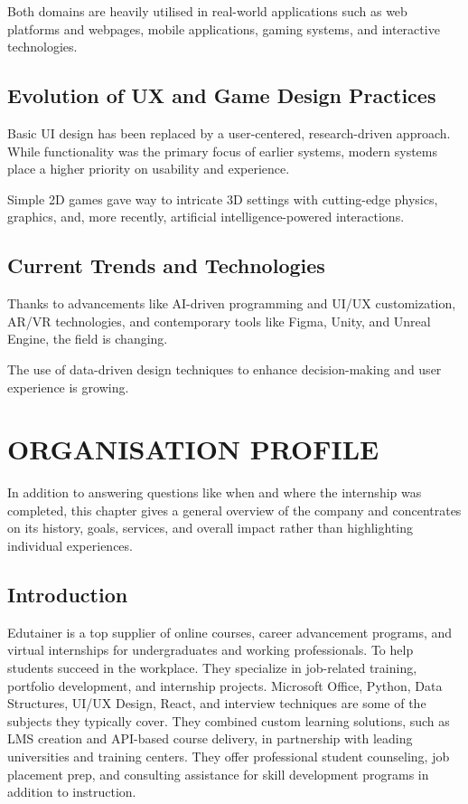 \documentclass[12pt,a4paper]{report}
\begin{document}
Both domains are heavily utilised in real-world applications such as web platforms and webpages, mobile applications, gaming systems, and interactive technologies.

\section{Evolution of UX and Game Design Practices}
Basic UI design has been replaced by a user-centered, research-driven approach. While functionality was the primary focus of earlier systems, modern systems place a higher priority on usability and experience.

Simple 2D games gave way to intricate 3D settings with cutting-edge physics, graphics, and, more recently, artificial intelligence-powered interactions.

\section{Current Trends and Technologies}
Thanks to advancements like AI-driven programming and UI/UX customization, AR/VR technologies, and contemporary tools like Figma, Unity, and Unreal Engine, the field is changing.

The use of data-driven design techniques to enhance decision-making and user experience is growing.

\chapter{ORGANISATION PROFILE}

In addition to answering questions like when and where the internship was completed, this chapter gives a general overview of the company and concentrates on its history, goals, services, and overall impact rather than highlighting individual experiences.

\section{Introduction}
Edutainer is a top supplier of online courses, career advancement programs, and virtual internships for undergraduates and working professionals. To help students succeed in the workplace. They specialize in job-related training, portfolio development, and internship projects. Microsoft Office, Python, Data Structures, UI/UX Design, React, and interview techniques are some of the subjects they typically cover. They combined custom learning solutions, such as LMS creation and API-based course delivery, in partnership with leading universities and training centers. They offer professional student counseling, job placement prep, and consulting assistance for skill development programs in addition to instruction.
\end{document}
